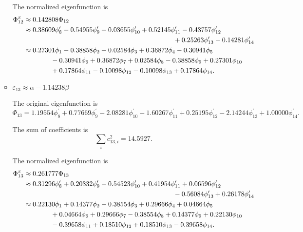 \documentclass[a4paper]{book}
\begin{document}
\begin{solution}
\begin{enumerate}[label=(\alph*)]
\begin{itemize}
		The normalized eigenfunction is		
		\begin{align}
			\Phi^\pi_{12} &\approx 0.142808 \Phi_{12} \notag \\
			&\approx 0.38609 \phi^\prime_8 - 0.54955 \phi^\prime_9 + 0.03655 \phi^\prime_{10} + 0.52145 \phi^\prime_{11} - 0.43757  \phi^\prime_{12}  \notag\\
			&\hspace*{22em} +0.25263 \phi^\prime_{13} - 0.14281  \phi^\prime_{14} \notag \\
			&\approx 0.27301 \phi_1 -0.38858  \phi_2  +0.02584 \phi_3 +0.36872 \phi_4 -0.30941  \phi_5  \notag \\
			&\hspace*{4em} -0.30941 \phi_6  +0.36872 \phi_7 +0.02584 \phi_8  -0.38858 \phi_9 +0.27301 \phi_{10} \notag \\
			&\hspace*{4em} +0.17864 \phi_{11} -0.10098  \phi_{12}   -0.10098 \phi_{13}  +0.17864 \phi_{14} .
		\end{align}
		
		
		\item $\varepsilon_{13} \approx \alpha - 1.14238 \beta$
		
		The original eigenfunction is
		\begin{equation*}
			\Phi_{13} =  1.19554 \phi^\prime_8 + 0.77669 \phi^\prime_9 -2.08281  \phi^\prime_{10} + 1.60267 \phi^\prime_{11}   +0.25195 \phi^\prime_{12} -2.14244 \phi^\prime_{13} + 1.00000 \phi^\prime_{14}.
		\end{equation*}
		
		The sum of coefficients is
		\begin{equation*}
			\sum_{i} c^2_{13,i} = 14.5927.
		\end{equation*}
		
		The normalized eigenfunction is		
		\begin{align}
			\Phi^\pi_{13} &\approx  0.261777 \Phi_{13} \notag \\
			&\approx  0.31296 \phi^\prime_8 + 0.20332 \phi^\prime_9  -0.54523 \phi^\prime_{10} +0.41954 \phi^\prime_{11} + 0.06596  \phi^\prime_{12}  \notag\\
			&\hspace*{22em} -0.56084 \phi^\prime_{13} + 0.26178  \phi^\prime_{14} \notag \\
			&\approx  0.22130 \phi_1 +0.14377 \phi_2 -0.38554  \phi_3 +0.29666 \phi_4 + 0.04664  \phi_5  \notag \\
			&\hspace*{4em} + 0.04664  \phi_6  +0.29666 \phi_7 -0.38554  \phi_8  +0.14377 \phi_9 + 0.22130 \phi_{10} \notag \\
			&\hspace*{4em}  -0.39658 \phi_{11} +0.18510 \phi_{12}  +0.18510 \phi_{13} -0.39658 \phi_{14} .
		\end{align}
		

\end{itemize}
\end{enumerate}
\end{solution}
\end{document}
